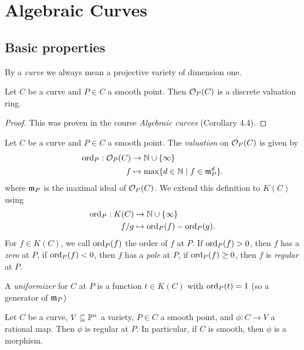 \section{Algebraic Curves}

\subsection{Basic properties}

By a \emph{curve} we always mean a projective variety of dimension one.

\begin{proposition}
	Let $C$ be a curve and $P \in C$ a smooth point.
	Then $\mathcal{O}_P(C)$ is a discrete valuation ring.
\end{proposition}

\begin{proof}
	This was proven in the course \emph{Algebraic curves}
	(Corollary 4.4).
\end{proof}

\begin{definition}
	Let $C$ be a curve and $P \in C$ a smooth point. The \emph{valuation}
	on $\mathcal{O}_P(C)$ is given by
	\begin{align*}
		\operatorname{ord}_P: \mathcal{O}_P(C) &\to \mathbb{N}\cup\{\infty\}\\
		f &\mapsto \max\{d \in \mathbb{N} \mid f \in \mathfrak{m}_P^d\}.
	\end{align*}
	where $\mathfrak{m}_P$ is the maximal ideal of $\mathcal{O}_P(C)$.
	We extend this definition to $K(C)$ using
	\begin{align*}
		\operatorname{ord}_P: K(C) &\to \mathbb{N}\cup\{\infty\}\\
		f/g &\mapsto \operatorname{ord}_P(f) - \operatorname{ord}_P(g).
	\end{align*}
	For $f \in K(C)$, we call $\operatorname{ord}_P(f)$ the order of $f$ at $P$.
	If $\operatorname{ord}_P(f) > 0$, then $f$ has a \emph{zero} at $P$,
	if $\operatorname{ord}_P(f) < 0$, then $f$ has a \emph{pole} at $P$,
	if $\operatorname{ord}_P(f) \geq 0$, then $f$ is \emph{regular} at $P$.
	
	A \emph{uniformizer} for $C$ at $P$ is a function $t \in K(C)$ with
	$\operatorname{ord}_P(t) = 1$ (so a generator of $\mathfrak{m}_P$)
\end{definition}

\begin{proposition}
	Let $C$ be a curve, $V \subseteq \mathbb{P}^n$ a variety,
	$P \in C$ a smooth point, and $\phi: C \to V$ a rational map.
	Then $\phi$ is regular at $P$. In particular, if $C$ is smooth, 
	then $\phi$ is a morphism.
\end{proposition}

